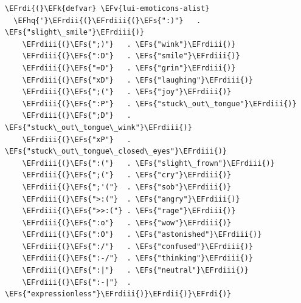 \documentclass{scrartcl}
\newcommand{\EFk}[1]{\textcolor{EFk}{#1}} %
\newcommand{\EFs}[1]{\textcolor{EFs}{#1}} %
\newcommand{\EFv}[1]{\textcolor{EFv}{#1}} %
\newcommand{\EFhq}[1]{\textcolor{EFhq}{#1}} %
\newcommand{\EFrdi}[1]{\textcolor{EFrdi}{#1}} %
\newcommand{\EFrdii}[1]{\textcolor{EFrdii}{#1}} %
\newcommand{\EFrdiii}[1]{\textcolor{EFrdiii}{#1}} %
\begin{document}
\begin{Code}
\begin{Verbatim}[]
\EFrdi{(}\EFk{defvar} \EFv{lui-emoticons-alist}
  \EFhq{'}\EFrdii{(}\EFrdiii{(}\EFs{":)"}   . \EFs{"slight\_smile"}\EFrdiii{)}
    \EFrdiii{(}\EFs{";)"}   . \EFs{"wink"}\EFrdiii{)}
    \EFrdiii{(}\EFs{":D"}   . \EFs{"smile"}\EFrdiii{)}
    \EFrdiii{(}\EFs{"=D"}   . \EFs{"grin"}\EFrdiii{)}
    \EFrdiii{(}\EFs{"xD"}   . \EFs{"laughing"}\EFrdiii{)}
    \EFrdiii{(}\EFs{";("}   . \EFs{"joy"}\EFrdiii{)}
    \EFrdiii{(}\EFs{":P"}   . \EFs{"stuck\_out\_tongue"}\EFrdiii{)}
    \EFrdiii{(}\EFs{";D"}   . \EFs{"stuck\_out\_tongue\_wink"}\EFrdiii{)}
    \EFrdiii{(}\EFs{"xP"}   . \EFs{"stuck\_out\_tongue\_closed\_eyes"}\EFrdiii{)}
    \EFrdiii{(}\EFs{":("}   . \EFs{"slight\_frown"}\EFrdiii{)}
    \EFrdiii{(}\EFs{";("}   . \EFs{"cry"}\EFrdiii{)}
    \EFrdiii{(}\EFs{";'("}  . \EFs{"sob"}\EFrdiii{)}
    \EFrdiii{(}\EFs{">:("}  . \EFs{"angry"}\EFrdiii{)}
    \EFrdiii{(}\EFs{">>:("} . \EFs{"rage"}\EFrdiii{)}
    \EFrdiii{(}\EFs{":o"}   . \EFs{"wow"}\EFrdiii{)}
    \EFrdiii{(}\EFs{":O"}   . \EFs{"astonished"}\EFrdiii{)}
    \EFrdiii{(}\EFs{":/"}   . \EFs{"confused"}\EFrdiii{)}
    \EFrdiii{(}\EFs{":-/"}  . \EFs{"thinking"}\EFrdiii{)}
    \EFrdiii{(}\EFs{":|"}   . \EFs{"neutral"}\EFrdiii{)}
    \EFrdiii{(}\EFs{":-|"}  . \EFs{"expressionless"}\EFrdiii{)}\EFrdii{)}\EFrdi{)}
\end{Verbatim}
\end{Code}
\end{document}
